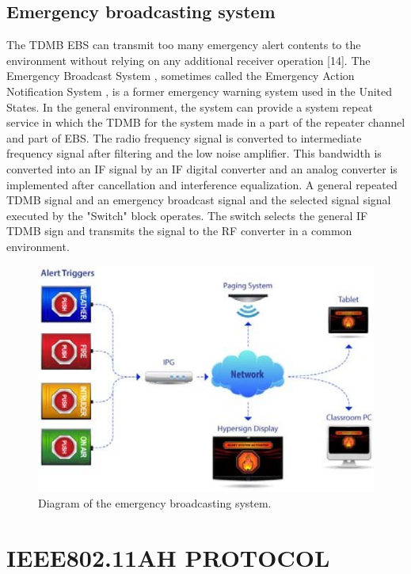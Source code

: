 \documentclass[11pt]{article}
\begin{document}
\subsection{Emergency broadcasting system}

The TDMB EBS can transmit too many emergency alert contents to the environment without relying on any additional receiver operation [14]. The Emergency Broadcast System , sometimes called the Emergency Action Notification System , is a former emergency warning system used in the United States. In the general environment, the system can provide a system repeat service in which the TDMB for the system made in a part of the repeater channel and part of EBS. The radio frequency signal is converted to intermediate frequency signal after filtering and the low noise amplifier. This bandwidth is converted into an IF signal by an IF digital converter and an analog converter is implemented after cancellation and interference equalization. A general repeated TDMB signal and an emergency broadcast signal and the selected signal signal executed by the "Switch" block operates. The switch selects the general IF TDMB sign and transmits the signal to the RF converter in a common environment.

\begin{figure}[h]
\begin{center}
\includegraphics[scale=0.5]{ebs structure.png}
\end{center}
\caption{Diagram of the emergency broadcasting system.}
\label{setup}
\end{figure}

\section{IEEE802.11AH PROTOCOL}
\end{document}
